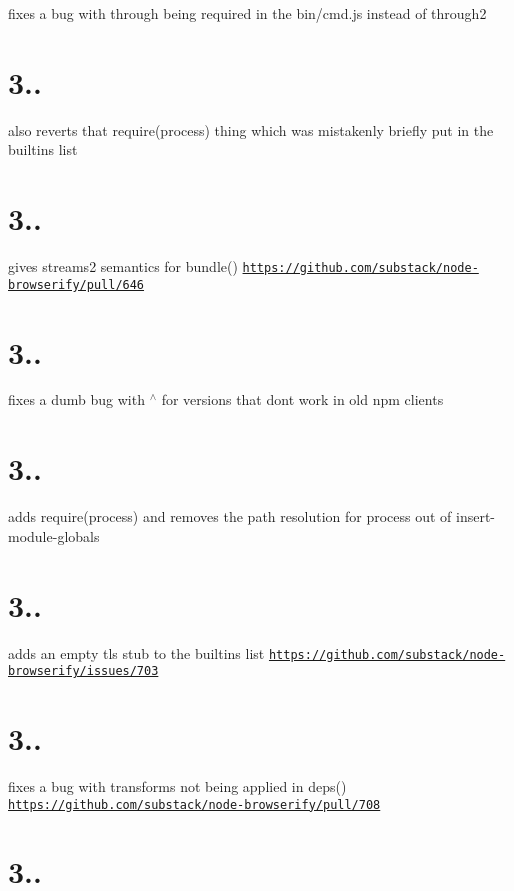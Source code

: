 fixes a bug with through being required in the bin/cmd.\+js instead of through2

\section*{3..}

also reverts that require(\textquotesingle{}process\textquotesingle{}) thing which was mistakenly briefly put in the builtins list

\section*{3..}

gives streams2 semantics for bundle() \href{https://github.com/substack/node-browserify/pull/646}{\tt https\+://github.\+com/substack/node-\/browserify/pull/646}

\section*{3..}

fixes a dumb bug with $^\wedge$ for versions that don\textquotesingle{}t work in old npm clients

\section*{3..}

adds require(\textquotesingle{}process\textquotesingle{}) and removes the path resolution for process out of insert-\/module-\/globals

\section*{3..}

adds an empty tls stub to the builtins list \href{https://github.com/substack/node-browserify/issues/703}{\tt https\+://github.\+com/substack/node-\/browserify/issues/703}

\section*{3..}

fixes a bug with transforms not being applied in deps() \href{https://github.com/substack/node-browserify/pull/708}{\tt https\+://github.\+com/substack/node-\/browserify/pull/708}

\section*{3..}

